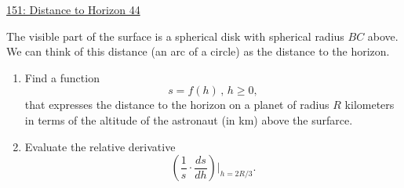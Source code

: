 \documentclass{ximera}
\begin{document}
\href{https://www.desmos.com/calculator/8shf1msp4m}{151: Distance to Horizon 44}

The visible part of the surface is a spherical disk with spherical radius $BC$ above. We can think of this distance (an arc of a circle) as the distance to the horizon.

\begin{enumerate}
\item Find a function 
\[
   s = f(h) \, , \, h\geq 0,
\]
that expresses the distance to the horizon on a planet of radius $R$ kilometers in terms of the altitude of the astronaut (in km) above the surfarce.

\item Evaluate the relative derivative
\[
      \left(  \frac{1}{s} \cdot \frac{ds}{dh} \right)\Big|_{h=2R/3} .
\]
\end{enumerate}
\end{document}
